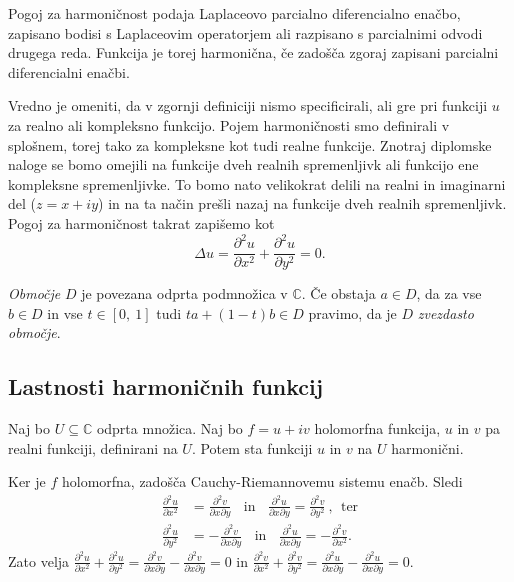 \documentclass[mat1, tisk]{fmfdelo}
\begin{document}
    Pogoj za harmoničnost podaja Laplaceovo parcialno diferencialno enačbo, zapisano bodisi s Laplaceovim operatorjem ali razpisano s parcialnimi odvodi drugega reda. 
    Funkcija je torej harmonična, če zadošča zgoraj zapisani parcialni diferencialni enačbi. 

    Vredno je omeniti, da v zgornji definiciji nismo specificirali, ali gre pri funkciji $u$ za realno ali kompleksno funkcijo. 
    Pojem harmoničnosti smo definirali v splošnem, torej tako za kompleksne kot tudi realne funkcije.
    Znotraj diplomske naloge se bomo omejili na funkcije dveh realnih spremenljivk ali funkcijo ene kompleksne spremenljivke. To bomo nato velikokrat delili na realni in imaginarni del ($z = x + iy $) in na ta način prešli nazaj na funkcije dveh realnih spremenljivk.
    Pogoj za harmoničnost takrat zapišemo kot
        $$
            \Delta u = \frac{\partial^2 u}{\partial x ^ 2} +  \frac{\partial^2 u}{\partial y ^ 2}= 0.
        $$

    \begin{definicija}
        \emph{Območje} $D$ je povezana odprta podmnožica v $\mathbb{C}$.
        Če obstaja $a \in D$, da za vse $b \in D$ in vse $t \in [0,~1]$ tudi $t a + (1-t)b \in D$ pravimo, da je $D$ \emph{zvezdasto območje}.
    \end{definicija}

\subsection{Lastnosti harmoničnih funkcij}
    \begin{trditev}
        \label{hh}
        Naj bo $U \subseteq \mathbb{C}$ odprta množica. Naj bo $f = u + iv$ holomorfna funkcija, $u$ in $v$ pa realni funkciji, definirani na $U$. Potem sta funkciji $u$ in $v$ na $U$ harmonični.
    \end{trditev}

    \begin{dokaz}
        Ker je $f$ holomorfna, zadošča Cauchy-Riemannovemu sistemu enačb. Sledi
        \begin{align*}
            \frac{\partial^2 u}{\partial x^2} &= \frac{\partial^2 v}{\partial x \partial y}~~~~\text{in}~~~~\frac{\partial^2 u}{\partial x \partial y} = \frac{\partial^2 v}{\partial y^2}~,~~\text{ter}\\ 
            \frac{\partial^2 u}{\partial y^2} &=  - \frac{\partial^2 v}{\partial x \partial y}~~~~\text{in}~~~~\frac{\partial^2 u}{\partial x \partial y} =  - \frac{\partial^2 v}{\partial x^2}.
        \end{align*}
        Zato velja $\frac{\partial^2 u}{\partial x^2} + \frac{\partial^2 u}{\partial y^2} = \frac{\partial^2 v}{\partial x \partial y} - \frac{\partial^2 v}{\partial x \partial y} =0$ in $\frac{\partial^2 v}{\partial x^2} + \frac{\partial^2 v}{\partial y^2} = \frac{\partial^2 u}{\partial x \partial y} - \frac{\partial^2 u}{\partial x \partial y}=0$.
    \end{dokaz}
\end{document}

